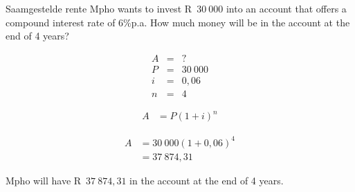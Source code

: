 

\begin{wex}{Saamgestelde rente}{
    Mpho wants to invest R~$30~000$ into an account that offers a compound interest rate of $6\%$p.a. How much money will be in the account at the end of 4 years?}{
    
    \begin{eqnarray*}
	A &=& ?\\
	P &=& 30~000\\
	i &=& 0,06\\
	n &=& 4
    \end{eqnarray*}

    \begin{align*}
	A &= P(1 + i)^n
    \end{align*}

    \begin{align*}
	A &= 30~000(1 + 0,06)^4\\
	  &= 37~874,31
    \end{align*}

    Mpho will have R~$37~874,31$ in the account at the end of 4 years.
    }
\end{wex}


